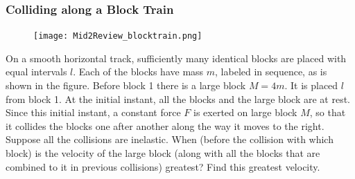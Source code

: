 \documentclass[a4paper,12pt,titlepage]{article}
\begin{document}
\subsubsection{Colliding along a Block Train\label{ex:CoMFoR}}
\begin{figure}
\texttt{[image: Mid2Review\_blocktrain.png]}
\end{figure}
On a smooth horizontal track, sufficiently many identical blocks are placed with equal intervals $l$. Each of the blocks have mass $m$, labeled in sequence, as is shown in the figure. Before block 1 there is a large block $M=4m$. It is placed $l$ from block 1. At the initial instant, all the blocks and the large block are at rest. Since this initial instant, a constant force $F$ is exerted on large block $M$, so that it collides the blocks one after another along the way it moves to the right. Suppose all the collisions are inelastic. When (before the collision with which block) is the velocity of the large block (along with all the blocks that are combined to it in previous collisions) greatest? Find this greatest velocity.
\end{document}
